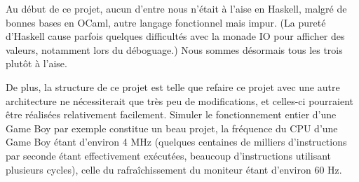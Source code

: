 \documentclass[a4paper,12pt,twoside]{article}
\begin{document}
Au début de ce projet, aucun d'entre nous n'était à l'aise en Haskell, malgré de bonnes bases en OCaml, autre langage fonctionnel mais impur. (La pureté d'Haskell cause parfois quelques difficultés avec la monade IO pour afficher des valeurs, notamment lors du déboguage.)
Nous sommes désormais tous les trois plutôt à l'aise.

De plus, la structure de ce projet est telle que refaire ce projet avec une autre architecture ne nécessiterait que très peu de modifications, et celles-ci pourraient être réalisées relativement facilement. Simuler le fonctionnement entier d'une Game Boy par exemple constitue un beau projet, la fréquence du CPU d'une Game Boy étant d'environ 4 MHz (quelques centaines de milliers d'instructions par seconde étant effectivement exécutées, beaucoup d'instructions utilisant plusieurs cycles), celle du rafraîchissement du moniteur étant d'environ 60 Hz.
\end{document}
